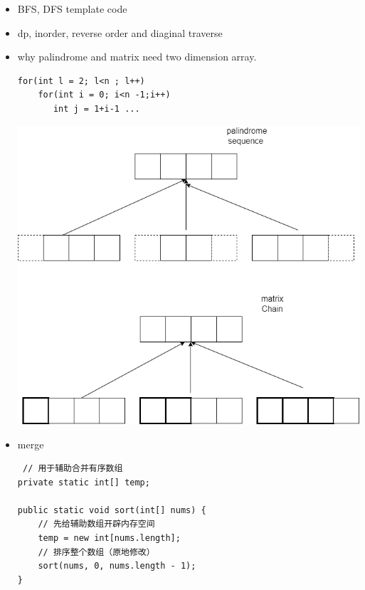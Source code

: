 \documentclass[a4paper,11pt,twoside]{book}
\begin{document}
\begin{itemize}
\begin{lstlisting}
		int left = 0, right = 0;
		int valid = 0; 
		while (right < s.size()) {
			// c 是将移入窗口的字符
			char c = s[right];
			// 增大窗口
			right++;
			// 进行窗口内数据的一系列更新
			...
			
			/*** debug 输出的位置 ***/
			printf("window: [%d, %d)\n", left, right);
			/********************/
			
			// 判断左侧窗口是否要收缩
			while (window needs shrink) {
				// d 是将移出窗口的字符
				char d = s[left];
				// 缩小窗口
				left++;
				// 进行窗口内数据的一系列更新
				...
			}
		}
	}
\end{lstlisting}
	
	\item BFS, DFS template code
	\item dp, inorder, reverse order and diaginal traverse
	
	\item why palindrome and matrix need two dimension array. 
\begin{lstlisting}
for(int l = 2; l<n ; l++)
	for(int i = 0; i<n -1;i++)
	   int j = 1+i-1 ...
\end{lstlisting}
	
	\includegraphics[scale=0.25]{pics/dp.drawio.png}
	
	
	\item merge
\begin{lstlisting}
 // 用于辅助合并有序数组
private static int[] temp;

public static void sort(int[] nums) {
	// 先给辅助数组开辟内存空间
	temp = new int[nums.length];
	// 排序整个数组（原地修改）
	sort(nums, 0, nums.length - 1);
}


\end{lstlisting}
\end{itemize}
\end{document}

